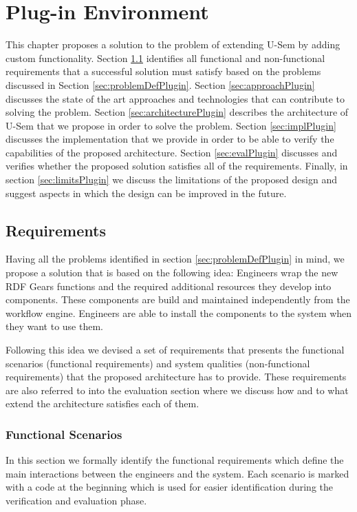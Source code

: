 
\chapter{Plug-in Environment}
\label{cha:plug-in}

This chapter proposes a solution to the problem of extending U-Sem by adding custom functionality. Section \ref{sec:requirementsPlugin} identifies all functional and non-functional requirements that a successful solution must satisfy based on the problems discussed in Section \ref{sec:problemDefPlugin}. Section \ref{sec:approachPlugin} discusses the state of the art approaches and technologies that can contribute to solving the problem. Section \ref{sec:architecturePlugin} describes the architecture of U-Sem that we propose in order to solve the problem. Section \ref{sec:implPlugin} discusses the implementation that we provide in order to be able to verify the capabilities of the proposed architecture. Section \ref{sec:evalPlugin} discusses and verifies whether the proposed solution satisfies all of the requirements. Finally, in section \ref{sec:limitsPlugin} we discuss the limitations of the proposed design and suggest aspects in which the design can be improved in the future.

\section{Requirements}
\label{sec:requirementsPlugin}

Having all the problems identified in section \ref{sec:problemDefPlugin} in mind, we propose a solution that is based on the following idea: Engineers wrap the new RDF Gears functions and the required additional resources they develop into components. These components are build and maintained independently from the workflow engine. Engineers are able to install the components to the system when they want to use them.

Following this idea we devised a set of requirements that presents the functional scenarios (functional requirements) and system qualities (non-functional requirements) that the proposed architecture has to provide. These requirements are also referred to into the evaluation section where we discuss how and to what extend the architecture satisfies each of them.

\subsection{Functional Scenarios}
In this section we formally identify the functional requirements which define the main interactions between the engineers and the system. Each scenario is marked with a code at the beginning which is used for easier identification during the verification and evaluation phase.

